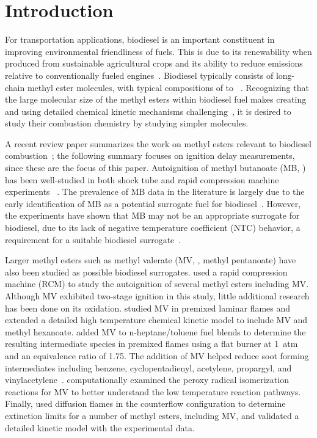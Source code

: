 \documentclass[letterpaper, review]{elsarticle}
\begin{document}
\linenumbers

\section{Introduction}\label{sec:introduction}

For transportation applications, biodiesel is an important constituent in improving environmental
friendliness of fuels. This is due to its renewability when produced from sustainable agricultural
crops and its ability to reduce emissions relative to conventionally fueled
engines~\cite{Hoekman2012}. Biodiesel typically consists of long-chain methyl ester molecules, with
typical compositions of  to ~\cite{Hoekman2012}. Recognizing that the large
molecular size of the methyl esters within biodiesel fuel makes creating and using detailed chemical
kinetic mechanisms challenging~\cite{Lai2011}, it is desired to study their combustion chemistry by
studying simpler molecules.

A recent review paper summarizes the work on methyl esters relevant to biodiesel
combustion~\cite{Coniglio2013}; the following summary focuses on ignition delay measurements, since
these are the focus of this paper. Autoignition of methyl butanoate (MB, ) has been
well-studied in both shock tube and rapid compression machine experiments~
\cite{Metcalfe2007,Walton2009,Dooley2008,Akih-Kumgeh2010,Akih-Kumgeh2011,Hadj-Ali2009,Kumar2016}.
The prevalence of MB data in the literature is largely due to the early identification of MB as a
potential surrogate fuel for biodiesel~\cite{Fisher2000}. However, the experiments have shown that
MB may not be an appropriate surrogate for biodiesel, due to its lack of negative temperature
coefficient (NTC) behavior, a requirement for a suitable biodiesel surrogate~\cite{Coniglio2013}.

Larger methyl esters such as methyl valerate (MV, , methyl pentanoate) have also been
studied as possible biodiesel surrogates. \citet{Hadj-Ali2009} used a rapid compression machine
(RCM) to study the autoignition of several methyl esters including MV. Although MV exhibited
two-stage ignition in this study, little additional research has been done on its oxidation.
\citet{Korobeinichev2015} studied MV in premixed laminar flames and extended a detailed high
temperature chemical kinetic model to include MV and methyl hexanoate. \citet{Dmitriev2015} added
MV to n-heptane/toluene fuel blends to determine the resulting intermediate species in premixed
flames using a flat burner at \SI{1}{atm} and an equivalence ratio of 1.75. The addition of MV
helped reduce soot forming intermediates including benzene, cyclopentadienyl, acetylene, propargyl,
and vinylacetylene~\cite{Dmitriev2015}. \citet{Hayes2009} computationally examined the peroxy
radical isomerization reactions for MV to better understand the low temperature reaction pathways.
Finally, \citet{Dievart2013} used diffusion flames in the counterflow configuration to determine
extinction limits for a number of methyl esters, including MV, and validated a detailed kinetic
model with the experimental data.
\end{document}
